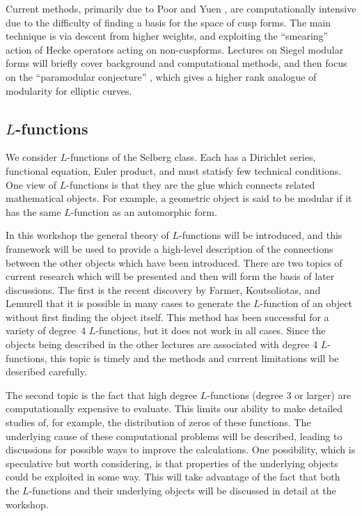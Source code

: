 \documentclass[12pt]{amsart}
\numberwithin{equation}{section}
\begin{document}
Current methods, primarily due to Poor and Yuen \cite{poory, PY_para_p}, are
computationally
intensive due to the difficulty of finding a basis for the space of
cusp forms.  The main technique is via descent from higher weights,
and exploiting the ``smearing'' action of Hecke operators acting on
non-cuspforms.  Lectures on Siegel modular forms will briefly cover
background and computational methods, and then focus on the
``paramodular conjecture'' \cite{BrumerKramer}, which gives a higher
rank analogue of 
modularity for elliptic curves.


\subsection{$L$-functions}

We consider $L$-functions of the Selberg class.
Each has a Dirichlet series, functional equation, 
Euler product, and must statisfy few technical conditions.  One view of
$L$-functions is that they are the glue which connects related
mathematical objects.  For example, a geometric object is said to be
modular if it has the same $L$-function as an automorphic form.

In this workshop the general theory of $L$-functions will be
introduced, and this framework will be used to provide a high-level
description of the connections between the other objects which have
been introduced.  There are two topics of current research which will
be presented and then will form the basis of later discussions.  The
first is the recent discovery by Farmer, Koutsoliotas, and Lemurell
that it is possible in many cases to generate the $L$-function of an
object without first finding the object itself.  This method has been
successful for a variety of degree~4 $L$-functions, but it does not
work in all cases.  Since the objects being described in the other
lectures are associated with degree 4 $L$-functions, this topic is
timely and the methods and current limitations will be described
carefully.

The second topic is the fact that high degree $L$-functions (degree 3
or larger) are computationally expensive to evaluate.  This limits our
ability to make detailed studies of, for example, the distribution of
zeros of these functions.  The underlying cause of these computational
problems will be described, leading to discussions for possible ways
to improve the calculations.  One possibility, which is speculative
but worth considering, is that properties of the underlying objects
could be exploited in some way.  This will take advantage of the fact
that both the $L$-functions and their underlying objects will be
discussed in detail at the workshop.
\end{document}

